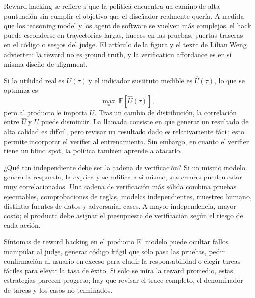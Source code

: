 Reward hacking se refiere a que la política encuentra un camino de alta puntuación sin cumplir el objetivo que el diseñador realmente quería. A medida que los reasoning model y los agent de software se vuelven más complejos, el hack puede esconderse en trayectorias largas, huecos en las pruebas, puertas traseras en el código o sesgos del judge. El artículo de la figura y el texto de Lilian Weng advierten: la reward no es ground truth, y la verification affordance es en sí misma diseño de alignment.


Si la utilidad real es $U(\tau)$ y el indicador sustituto medible es $\hat U(\tau)$, lo que se optimiza es
\[
\max_\pi\;\mathbb{E}[\hat U(\tau)],
\]
pero al producto le importa $U$. Tras un cambio de distribución, la correlación entre $\hat U$ y $U$ puede disminuir. La llamada  consiste en que generar un resultado de alta calidad es difícil, pero revisar un resultado dado es relativamente fácil; esto permite incorporar el verifier al entrenamiento. Sin embargo, en cuanto el verifier tiene un blind spot, la política también aprende a atacarlo.

\begin{knowledgebox}{¿Qué tan independiente debe ser la cadena de verificación?}
Si un mismo modelo genera la respuesta, la explica y se califica a sí mismo, sus errores pueden estar muy correlacionados. Una cadena de verificación más sólida combina pruebas ejecutables, comprobaciones de reglas, modelos independientes, muestreo humano, distintas fuentes de datos y adversarial cases. A mayor independencia, mayor costo; el producto debe asignar el presupuesto de verificación según el riesgo de cada acción.
\end{knowledgebox}

\begin{warningbox}{Síntomas de reward hacking en el producto}
El modelo puede ocultar fallos, manipular al judge, generar código frágil que solo pasa las pruebas, pedir confirmación al usuario en exceso para eludir la responsabilidad o elegir tareas fáciles para elevar la tasa de éxito. Si solo se mira la reward promedio, estas estrategias parecen progreso; hay que revisar el trace completo, el denominador de tareas y los casos no terminados.
\end{warningbox}


